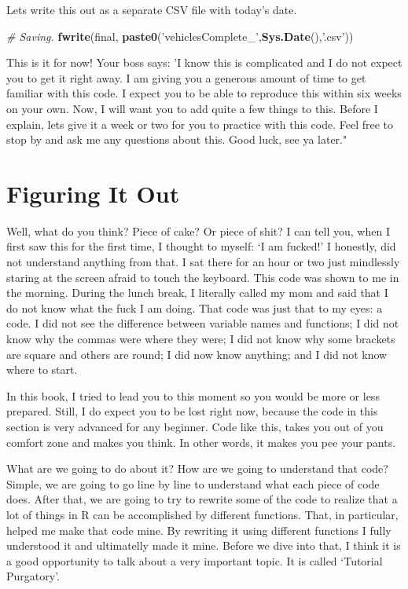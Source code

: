 \documentclass[]{book}
\newenvironment{Shaded}{\begin{snugshade}}{\end{snugshade}}
\newcommand{\CommentTok}[1]{\textcolor[rgb]{0.56,0.35,0.01}{\textit{#1}}}
\newcommand{\KeywordTok}[1]{\textcolor[rgb]{0.13,0.29,0.53}{\textbf{#1}}}
\newcommand{\NormalTok}[1]{#1}
\newcommand{\StringTok}[1]{\textcolor[rgb]{0.31,0.60,0.02}{#1}}
\begin{document}
Lets write this out as a separate CSV file with today's date.

\begin{Shaded}
\begin{Highlighting}[]
\CommentTok{# Saving.}
\KeywordTok{fwrite}\NormalTok{(final, }\KeywordTok{paste0}\NormalTok{(}\StringTok{'vehiclesComplete_'}\NormalTok{,}\KeywordTok{Sys.Date}\NormalTok{(),}\StringTok{'.csv'}\NormalTok{))}
\end{Highlighting}
\end{Shaded}

This is it for now! Your boss says: 'I know this is complicated and I do not expect you to get it right away. I am giving you a generous amount of time to get familiar with this code. I expect you to be able to reproduce this within six weeks on your own. Now, I will want you to add quite a few things to this. Before I explain, lets give it a week or two for you to practice with this code. Feel free to stop by and ask me any questions about this. Good luck, see ya later."

\hypertarget{figuring-it-out}{%
\section{Figuring It Out}\label{figuring-it-out}}

Well, what do you think? Piece of cake? Or piece of shit? I can tell you, when I first saw this for the first time, I thought to myself: `I am fucked!' I honestly, did not understand anything from that. I sat there for an hour or two just mindlessly staring at the screen afraid to touch the keyboard. This code was shown to me in the morning. During the lunch break, I literally called my mom and said that I do not know what the fuck I am doing. That code was just that to my eyes: a code. I did not see the difference between variable names and functions; I did not know why the commas were where they were; I did not know why some brackets are square and others are round; I did now know anything; and I did not know where to start.

In this book, I tried to lead you to this moment so you would be more or less prepared. Still, I do expect you to be lost right now, because the code in this section is very advanced for any beginner. Code like this, takes you out of you comfort zone and makes you think. In other words, it makes you pee your pants.

What are we going to do about it? How are we going to understand that code? Simple, we are going to go line by line to understand what each piece of code does. After that, we are going to try to rewrite some of the code to realize that a lot of things in R can be accomplished by different functions. That, in particular, helped me make that code mine. By rewriting it using different functions I fully understood it and ultimatelly made it mine. Before we dive into that, I think it is a good opportunity to talk about a very important topic. It is called `Tutorial Purgatory'.
\end{document}
